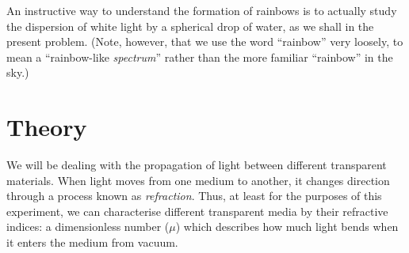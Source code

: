 An instructive way to understand the formation of rainbows is to actually study the dispersion of white light by a spherical drop of water, as we shall in the present problem. (Note, however, that we use the word ``rainbow'' very loosely, to mean a ``rainbow-like \textit{spectrum}'' rather than the more familiar ``rainbow'' in the sky.) 


\section*{Theory}

We will be dealing with the propagation of light between different transparent materials. When light moves from one medium to another, it changes direction through a process known as \textit{refraction}. Thus, at least for the purposes of this experiment, we can characterise different transparent media by their refractive indices: a dimensionless number ($\mu$) which describes how much light bends when it enters the medium from vacuum. 

